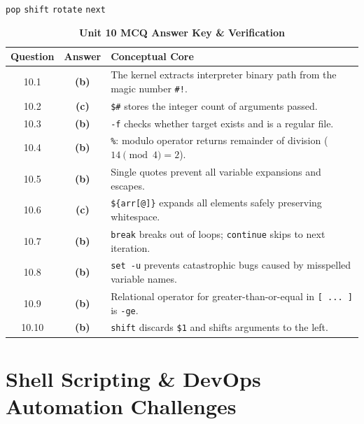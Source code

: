 {\texttt{pop}}
{\texttt{shift}}
{\texttt{rotate}}
{\texttt{next}}

\begin{table}[htbp]
\centering
\caption{\textbf{Unit 10 MCQ Answer Key \& Verification}}
\begin{tabularx}{0.85\linewidth}{c c X}
\toprule
\textbf{Question} & \textbf{Answer} & \textbf{Conceptual Core} \\
\midrule
10.1 & \textbf{(b)} & The kernel extracts interpreter binary path from the magic number \texttt{\#!}. \\
10.2 & \textbf{(c)} & \texttt{\$\#} stores the integer count of arguments passed. \\
10.3 & \textbf{(b)} & \texttt{-f} checks whether target exists and is a regular file. \\
10.4 & \textbf{(b)} & \texttt{\%}: modulo operator returns remainder of division ($14 \pmod 4 = 2$). \\
10.5 & \textbf{(b)} & Single quotes prevent all variable expansions and escapes. \\
10.6 & \textbf{(c)} & \texttt{\$\{arr[@]\}} expands all elements safely preserving whitespace. \\
10.7 & \textbf{(b)} & \texttt{break} breaks out of loops; \texttt{continue} skips to next iteration. \\
10.8 & \textbf{(b)} & \texttt{set -u} prevents catastrophic bugs caused by misspelled variable names. \\
10.9 & \textbf{(b)} & Relational operator for greater-than-or-equal in \texttt{[ ... ]} is \texttt{-ge}. \\
10.10 & \textbf{(b)} & \texttt{shift} discards \texttt{\$1} and shifts arguments to the left. \\
\bottomrule
\end{tabularx}
\end{table}

\section{Shell Scripting \& DevOps Automation Challenges}

